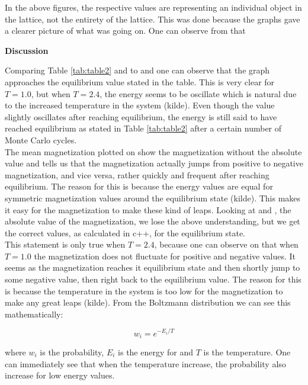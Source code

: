 \documentclass[10pt,a4paper]{article}
\begin{document}
\noindent In the above figures, the respective values are representing an individual object in the lattice, not the entirety of the lattice. This was done because the graphs gave a clearer picture of what was going on. One can observe from  that 

\newpage

\begin{center}
{\LARGE\bf Discussion}
\end{center}

\noindent Comparing Table \ref{tab:table2} and to  and  one can observe that the graph approaches the equilibrium value stated in the table. This is very clear for $T = 1.0$, but when $T = 2.4$, the energy seems to be oscillate which is natural due to the increased temperature in the system (kilde). Even though the value slightly oscillates after reaching equilibrium, the energy is still said to have reached equilibrium as stated in Table \ref{tab:table2} after a certain number of Monte Carlo cycles.
\\
The mean magnetization plotted on  show the magnetization without the absolute value and tells us that the magnetization actually jumps from positive to negative magnetization, and vice versa, rather quickly and frequent after reaching equilibrium. The reason for this is because the energy values are equal for symmetric magnetization values around the equilibrium state (kilde). This makes it easy for the magnetization to make these kind of leaps. Looking at  and , the absolute value of the magnetization, we lose the above understanding, but we get the correct values, as calculated in c++, for the equilibrium state.
\\
This statement is only true when $T = 2.4$, because one can observe on  that when $T = 1.0$ the magnetization does not fluctuate for positive and negative values. It seems as the magnetization reaches it equilibrium state and then shortly jump to some negative value, then right back to the equilibrium value. The reason for this is because the temperature in the system is too low for the magnetization to make any great leaps (kilde). From the Boltzmann distribution we can see this mathematically:

$$
w_i = e^{-E_i/T}
$$

\noindent where $w_i$ is the probability, $E_i$ is the energy for and $T$ is the temperature. One can immediately see that when the temperature increase, the probability also increase for low energy values.
\end{document}
